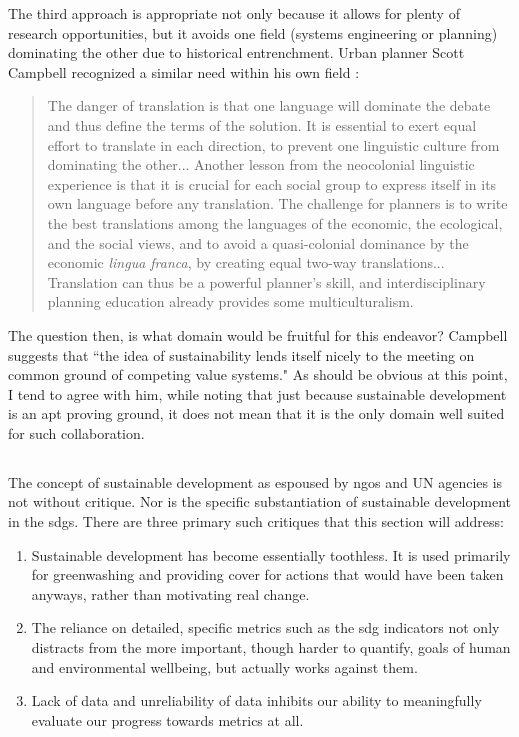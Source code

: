 The third approach is appropriate not only because it allows for plenty of research opportunities, but it avoids one field (systems engineering or planning) dominating the other due to historical entrenchment. Urban planner Scott Campbell recognized a similar need within his own field \cite{campbellGreenCitiesGrowing2016}:

\blockquote{The danger of translation is that one language will dominate the debate and thus define the terms of the solution. It is essential to exert equal effort to translate in each direction, to prevent one linguistic culture from dominating the other... Another lesson from the neocolonial linguistic experience is that it is crucial for each social group to express itself in its own language before any translation. The challenge for planners is to write the best translations among the languages of the economic, the ecological, and the social views, and to avoid a quasi-colonial dominance by the economic \textit{lingua franca}, by creating equal two-way translations... Translation can thus be a powerful planner's skill, and interdisciplinary planning education already provides some multiculturalism.}

The question then, is what domain would be fruitful for this endeavor? Campbell suggests that ``the idea of sustainability lends itself nicely to the meeting on common ground of competing value systems." As should be obvious at this point, I tend to agree with him, while noting that just because sustainable development is an apt proving ground, it does not mean that it is the only domain well suited for such collaboration.

\subsection{} \label{sec:sdg_critique}

The concept of sustainable development as espoused by \acp{ngo} and UN agencies is not without critique. Nor is the specific substantiation of sustainable development in the \acp{sdg}. There are three primary such critiques that this section will address:

\begin{enumerate} \setlength{\itemsep}{0pt} \setlength{\parskip}{0pt}
	\item Sustainable development has become essentially toothless. It is used primarily for greenwashing and providing cover for actions that would have been taken anyways, rather than motivating real change.
	\item The reliance on detailed, specific metrics such as the \ac{sdg} indicators not only distracts from the more important, though harder to quantify, goals of human and environmental wellbeing, but actually works against them. 
	\item Lack of data and unreliability of data inhibits our ability to meaningfully evaluate our progress towards metrics at all.
\end{enumerate}

